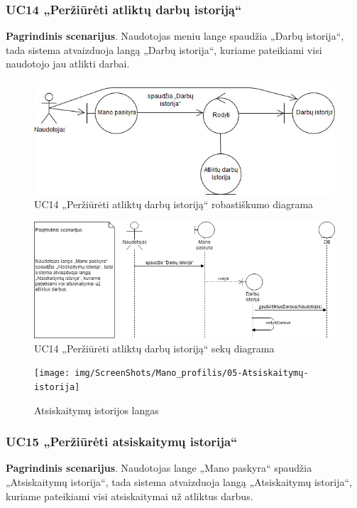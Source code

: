 \documentclass{VUMIFPSbakalaurinis}
\begin{document}
\subsubsection{UC14 „Peržiūrėti atliktų darbų istoriją“}
\textbf{Pagrindinis scenarijus}. Naudotojas meniu lange spaudžia „Darbų istorija“, tada sistema atvaizduoja langą „Darbų istorija“, kuriame pateikiami visi naudotojo jau atlikti darbai.

\begin{figure}[H]
	\centering
	\includegraphics[scale=0.6]{img/Robustness/UC14}
	\caption{UC14 „Peržiūrėti atliktų darbų istoriją“ robastiškumo diagrama}
	\label{img:uc14rob}
\end{figure}

\begin{figure}[H]
	\centering
	\includegraphics[scale=0.6]{img/Sequence/SD14}
	\caption{UC14 „Peržiūrėti atliktų darbų istoriją“ sekų diagrama}
	\label{img:uc14seq}
\end{figure}

\begin{figure}[H]
	\centering
	\texttt{[image: img/ScreenShots/Mano\_profilis/05-Atsiskaitymų-istorija]}
	\caption{Atsiskaitymų istorijos langas}
	\label{img:payment history}
\end{figure}
\subsubsection{UC15 „Peržiūrėti atsiskaitymų istorija“}
\textbf{Pagrindinis scenarijus}. Naudotojas lange „Mano paskyra“ spaudžia „Atsiskaitymų istorija“, tada sistema atvaizduoja langą „Atsiskaitymų istorija“, kuriame pateikiami visi atsiskaitymai už atliktus darbus.
\end{document}
